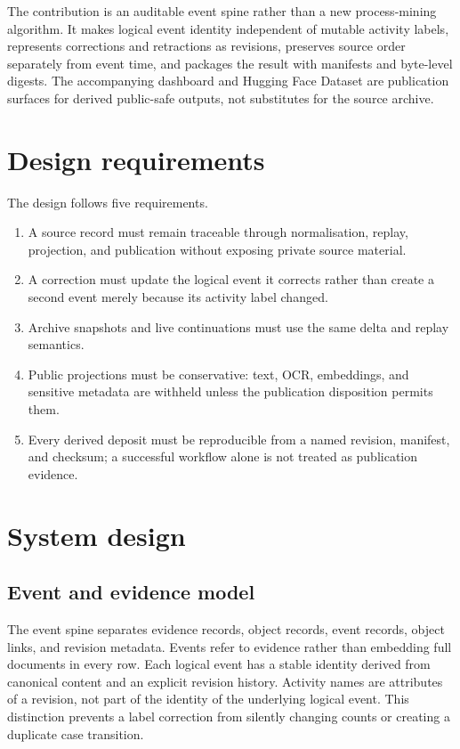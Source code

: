\documentclass[11pt]{article}
\begin{document}
The contribution is an auditable event spine rather than a new process-mining algorithm. It makes
logical event identity independent of mutable activity labels, represents corrections and
retractions as revisions, preserves source order separately from event time, and packages the
result with manifests and byte-level digests. The accompanying dashboard and Hugging Face Dataset
are publication surfaces for derived public-safe outputs, not substitutes for the source archive.

\section{Design requirements}
The design follows five requirements.
\begin{enumerate}
  \item A source record must remain traceable through normalisation, replay, projection, and
    publication without exposing private source material.
  \item A correction must update the logical event it corrects rather than create a second event
    merely because its activity label changed.
  \item Archive snapshots and live continuations must use the same delta and replay semantics.
  \item Public projections must be conservative: text, OCR, embeddings, and sensitive metadata are
    withheld unless the publication disposition permits them.
  \item Every derived deposit must be reproducible from a named revision, manifest, and checksum;
    a successful workflow alone is not treated as publication evidence.
\end{enumerate}

\section{System design}
\subsection{Event and evidence model}
The event spine separates evidence records, object records, event records, object links, and
revision metadata. Events refer to evidence rather than embedding full documents in every row.
Each logical event has a stable identity derived from canonical content and an explicit revision
history. Activity names are attributes of a revision, not part of the identity of the underlying
logical event. This distinction prevents a label correction from silently changing counts or
creating a duplicate case transition.
\end{document}
